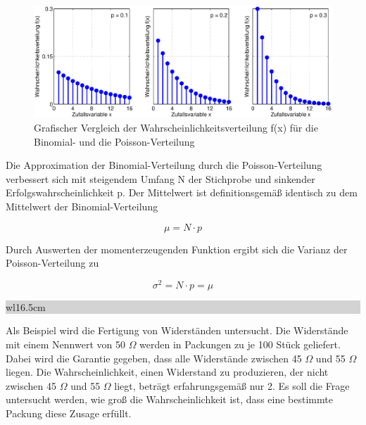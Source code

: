\clearpage

\noindent 
\begin{figure}[H]
  \centerline{\includegraphics[width=1\textwidth]{Kapitel4/Bilder/image18}}
  \caption{Grafischer Vergleich der Wahrscheinlichkeitsverteilung f(x) f\"{u}r die Binomial- und die Poisson-Verteilung}
  \label{fig:Diskret_Poisson}
\end{figure}

\noindent Die Approximation der Binomial-Verteilung durch die Poisson-Verteilung verbessert sich mit steigendem Umfang N der Stichprobe und sinkender Erfolgswahrscheinlichkeit p. Der Mittelwert ist definitionsgem\"{a}{\ss} identisch zu dem Mittelwert der Binomial-Verteilung

\begin{equation}\label{eq:fourhundredfifty}
\mu =N\cdot p
\end{equation}

\noindent Durch Auswerten der momenterzeugenden Funktion ergibt sich die Varianz der Poisson-Verteilung zu

\begin{equation}\label{eq:fourhundredfiftyone}
\sigma ^{2} =N\cdot p=\mu
\end{equation}

\noindent
\colorbox{lightgray}{%
%
\renewcommand\arraystretch{0.6}%
\begin{tabular}{ wl{16.5cm} }
{}
\end{tabular}%
}\medskip 

\noindent Als Beispiel wird die Fertigung von Widerst\"{a}nden untersucht. Die Widerst\"{a}nde mit einem Nennwert von 50 $\Omega$ werden in Packungen zu je 100 St\"{u}ck geliefert. Dabei wird die Garantie gegeben, dass alle Widerst\"{a}nde zwischen 45 $\Omega$ und 55 $\Omega$ liegen. Die Wahrscheinlichkeit, einen Widerstand zu produzieren, der nicht zwischen 45 $\Omega$ und 55 $\Omega$ liegt, betr\"{a}gt erfahrungsgem\"{a}{\ss} nur 2. Es soll die Frage untersucht werden, wie gro{\ss} die Wahrscheinlichkeit ist, dass eine bestimmte Packung diese Zusage erf\"{u}llt.\newline

